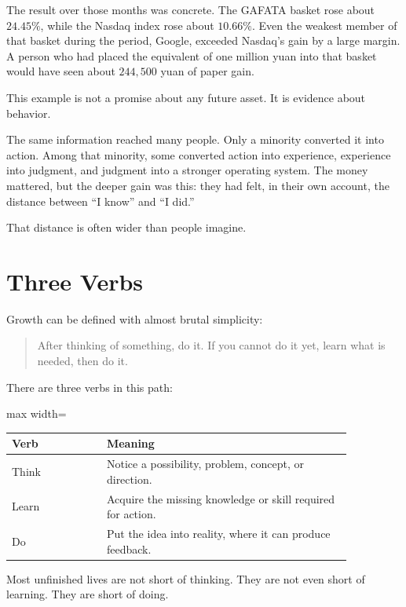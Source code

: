 The result over those months was concrete. The GAFATA basket rose about \(24.45\%\), while the Nasdaq index rose about \(10.66\%\). Even the weakest member of that basket during the period, Google, exceeded Nasdaq's gain by a large margin. A person who had placed the equivalent of one million yuan into that basket would have seen about \(244{,}500\) yuan of paper gain.

This example is not a promise about any future asset. It is evidence about behavior.

The same information reached many people. Only a minority converted it into action. Among that minority, some converted action into experience, experience into judgment, and judgment into a stronger operating system. The money mattered, but the deeper gain was this: they had felt, in their own account, the distance between ``I know'' and ``I did.''

That distance is often wider than people imagine.

\section*{Three Verbs}

Growth can be defined with almost brutal simplicity:

\begin{quote}
After thinking of something, do it. If you cannot do it yet, learn what is needed, then do it.
\end{quote}

There are three verbs in this path:

\begin{center}
\begin{adjustbox}{max width=\linewidth}
\begin{tabular}{p{0.24\linewidth}p{0.62\linewidth}}
\hline
Verb & Meaning \\
\hline
Think & Notice a possibility, problem, concept, or direction. \\
Learn & Acquire the missing knowledge or skill required for action. \\
Do & Put the idea into reality, where it can produce feedback. \\
\hline
\end{tabular}
\end{adjustbox}
\end{center}

Most unfinished lives are not short of thinking. They are not even short of learning. They are short of doing.

